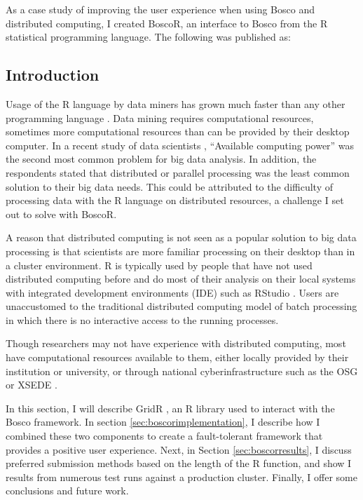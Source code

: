 As a case study of improving the user experience when using Bosco and distributed computing, I created BoscoR, an interface to Bosco from the R statistical programming language.  The following was published as:


\subsection{Introduction}
Usage of the R language \cite{team2012r} by data miners has grown much faster than any other programming language \cite{rexer2013, KDnuggets2013}.  Data mining requires computational resources, sometimes more computational resources than can be provided by their desktop computer.  In a recent study of data scientists \cite{rexer2013}, ``Available computing power'' was the second most common problem for big data analysis.  In addition, the respondents stated that distributed or parallel processing was the least common solution to their big data needs.  This could be attributed to the difficulty of processing data with the R language on distributed resources, a challenge I set out to solve with BoscoR.

A reason that distributed computing is not seen as a popular solution to big data processing is that scientists are more familiar processing on their desktop than in a cluster environment.  R is typically used by people that have not used distributed computing before and do most of their analysis on their local systems with integrated development environments (IDE) such as RStudio \cite{racine2012rstudio}.  Users are unaccustomed to the traditional distributed computing model of batch processing in which there is no interactive access to the running processes.

Though researchers may not have experience with distributed computing, most have computational resources available to them, either locally provided by their institution or university, or through national cyberinfrastructure such as the OSG \cite{pordes2007open} or XSEDE \cite{xsede}.



In this section, I will describe GridR \cite{wegener2007gridr}, an R library used to interact with the Bosco framework.  In section \ref{sec:boscorimplementation}, I describe how I combined these two components to create a fault-tolerant framework that provides a positive user experience.  Next, in Section \ref{sec:boscorresults}, I discuss preferred submission methods based on the length of the R function, and show I results from numerous test runs against a production cluster.  Finally, I offer some conclusions and future work.

